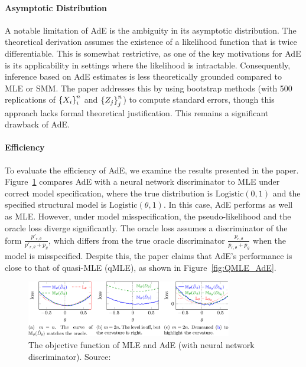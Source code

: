 \documentclass[12pt]{article}
\begin{document}
\paragraph{Asymptotic Distribution}
A notable limitation of AdE is the ambiguity in its asymptotic distribution.
The theoretical derivation assumes the existence of a likelihood function that
is twice differentiable. This is somewhat restrictive, as one of the key
motivations for AdE is its applicability in settings where the likelihood is
intractable. Consequently, inference based on AdE estimates is less
theoretically grounded compared to MLE or SMM. The paper addresses this by
using bootstrap methods (with 500 replications of \(\left\{X_i\right\}_i^n\) and
\(\left\{Z_j\right\}_j^n\)) to compute standard errors, though this approach lacks
formal theoretical justification. This remains a significant drawback of AdE.

\paragraph{Efficiency}
To evaluate the efficiency of AdE, we examine the results presented in the
paper. Figure~\ref{fig:MLE_AdE_NN} compares AdE with a neural network
discriminator to MLE under correct model specification, where the true
distribution is \(\text{Logistic}(0,1)\) and the specified structural model is
\(\text{Logistic}(\theta,1)\). In this case, AdE performs as well as MLE.
However, under model misspecification, the pseudo-likelihood and the oracle
loss diverge significantly. The oracle loss assumes a discriminator of the form
\(\frac{p'_{r,\theta}}{p'_{r,\theta}+p_g}\), which differs from the true oracle
discriminator \(\frac{p_{r,\theta}}{p_{r,\theta}+p_g}\) when the model is
misspecified. Despite this, the paper claims that AdE's performance is close to
that of quasi-MLE (qMLE), as shown in Figure~\ref{fig:QMLE_AdE}.

\begin{figure}[h!]
    \centering
    \includegraphics[width=0.8\textwidth]{../Figures/MLE_AdE_NN.png}
    \caption{The objective function of MLE and AdE (with neural network discriminator). Source: \citet{kaji2023adversarial}}
    \label{fig:MLE_AdE_NN}
\end{figure}
\end{document}
